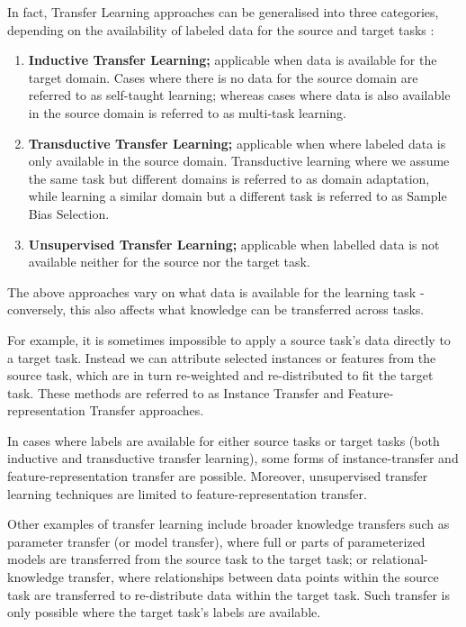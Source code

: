 In fact, Transfer Learning approaches can be generalised into three categories, depending on the availability of labeled data for the source and target tasks \citep{panyang2010}:
\begin{enumerate}  
\item \textbf{Inductive Transfer Learning;} applicable when data is available for the target domain. Cases where there is no data for the source domain are referred to as self-taught learning; whereas cases where data is also available in the source domain is referred to as multi-task learning.

\newpage

\item \textbf{Transductive Transfer Learning;} applicable when where labeled data is only available in the source domain. Transductive learning where we assume the same task but different domains is referred to as domain adaptation, while learning a similar domain but a different task is referred to as Sample Bias Selection.  

\item \textbf{Unsupervised Transfer Learning;} applicable when labelled data is not available neither for the source nor the target task.
\end{enumerate}

The above approaches vary on what data is available for the learning task - conversely, this also affects what knowledge can be transferred across tasks. 

For example, it is sometimes impossible to apply a source task's data directly to a target task. Instead we can attribute selected instances or features from the source task, which are in turn re-weighted and re-distributed to fit the target task. These methods are referred to as Instance Transfer and Feature-representation Transfer approaches.

In cases where labels are available for either source tasks or target tasks (both inductive and transductive transfer learning), some forms of instance-transfer and feature-representation transfer are possible. Moreover, unsupervised transfer learning techniques are limited to feature-representation transfer. \citep{panyang2010}

Other examples of transfer learning include broader knowledge transfers such as parameter transfer (or model transfer), where full or parts of parameterized models are transferred from the source task to the target task; or relational-knowledge transfer, where relationships between data points within the source task are transferred to re-distribute data within the target task. \citep{cook2013}  Such transfer is only possible where the target task's labels are available.


